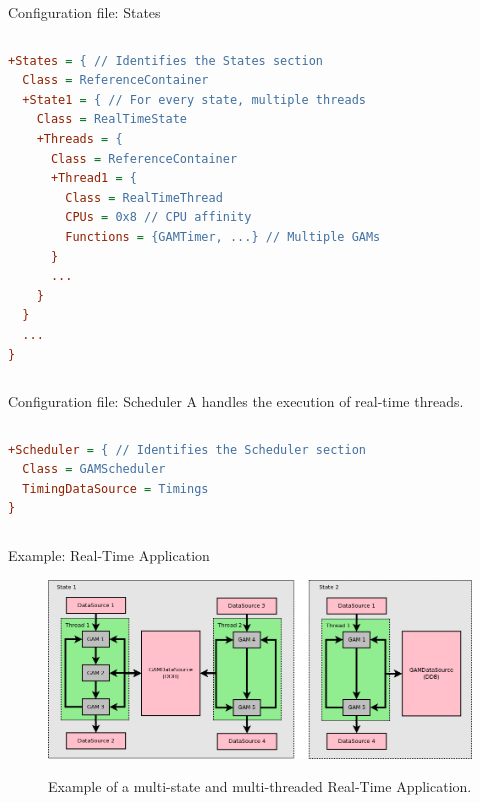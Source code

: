 \begin{frame}[fragile]{Configuration file: States}
	\begin{columns}
		\begin{lstlisting}[style=small, language=cfg, caption=States section of a configuration file.]
+States = { // Identifies the States section
  Class = ReferenceContainer
  +State1 = { // For every state, multiple threads
    Class = RealTimeState
    +Threads = {
      Class = ReferenceContainer
      +Thread1 = {
        Class = RealTimeThread
        CPUs = 0x8 // CPU affinity
        Functions = {GAMTimer, ...} // Multiple GAMs
      }
      ...
    }
  }
  ...
}\end{lstlisting}
	\end{columns}
\end{frame}

\begin{frame}[fragile]{Configuration file: Scheduler}
		A  handles the execution of real-time threads.
	\vspace{1cm}
	\begin{columns}
		\begin{lstlisting}[style=normal, language=cfg, caption=Scheduler section of a configuration file.]
+Scheduler = { // Identifies the Scheduler section
  Class = GAMScheduler
  TimingDataSource = Timings
}\end{lstlisting}
	\end{columns}
\end{frame}

\begin{frame}{Example: Real-Time Application}
	\begin{figure}
		\centering
		\includegraphics[width=.95\textwidth]{RTApp.png}
		\label{fig:rtapp_example}
		\caption{Example of a multi-state and multi-threaded Real-Time Application.}
	\end{figure}
\end{frame}
